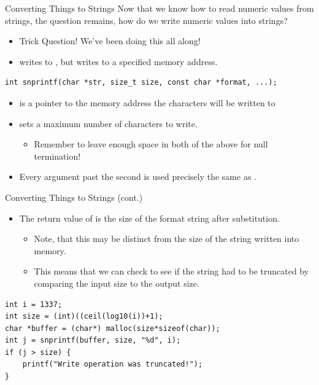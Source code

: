\documentclass[11pt]{beamer}
\let\OldTexttt\texttt
\renewcommand{\texttt}[1]{\OldTexttt{\color{teal}{#1}}}
\begin{document}
\begin{frame}[fragile=singleslide]{Converting Things to Strings}
Now that we know how to read numeric values from strings, the question remains, how do we write numeric values into strings?
\begin{itemize}
\item Trick Question! We've been doing this all along!
\item \texttt{printf()} writes to \texttt{stdout}, but \texttt{snprintf()} writes to a specified memory address.
\end{itemize}
\begin{lstlisting}[style = C]
int snprintf(char *str, size_t size, const char *format, ...);
\end{lstlisting}
\begin{itemize}
\item \texttt{str} is a pointer to the memory address the characters will be written to
\item \texttt{size} sets a maximum number of characters to write.
\begin{itemize}
\item Remember to leave enough space in both of the above for null termination! 
\end{itemize}
\item Every argument past the second is used precisely the same as \texttt{printf()}.
\end{itemize}
\end{frame}


\begin{frame}[fragile=singleslide]{Converting Things to Strings (cont.)}
\begin{itemize}
\item The return value of \texttt{snprintf()} is the size of the format string after substitution.  
\begin{itemize}
\item Note, that this may be distinct from the size of the string written into memory.
\item This means that we can check to see if the string had to be truncated by comparing the input size to the output size. 
\end{itemize}
\end{itemize}
\begin{lstlisting}[style = C]
int i = 1337;
int size = (int)((ceil(log10(i))+1);
char *buffer = (char*) malloc(size*sizeof(char)); 
int j = snprintf(buffer, size, "%d", i); 
if (j > size) {
	printf("Write operation was truncated!");
}
\end{lstlisting}
\end{frame}
\end{document}
